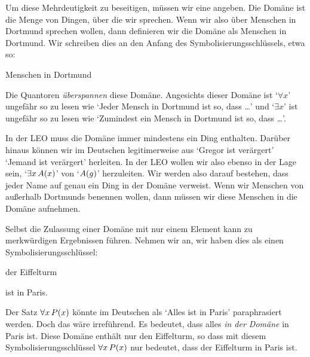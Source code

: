 Um diese Mehrdeutigkeit zu beseitigen, müssen wir eine  angeben. Die Domäne ist die Menge von Dingen, über die wir sprechen. Wenn wir also über Menschen in Dortmund sprechen wollen, dann definieren wir die Domäne als Menschen in Dortmund. Wir schreiben dies an den Anfang des Symbolisierungsschlüssels, etwa so:
	\begin{ekey}
		\item[\text{Domäne}] Menschen in Dortmund
	\end{ekey}
Die Quantoren \emph{überspannen} diese Domäne. Angesichts dieser Domäne ist `$\forall x$' ungefähr so zu lesen wie `Jeder Mensch in Dortmund ist so, dass \ldots' und `$\exists x$' ist ungefähr so zu lesen wie `Zumindest ein Mensch in Dortmund ist so, dass \ldots'. 


In der LEO muss die Domäne immer mindestens ein Ding enthalten. Darüber hinaus können wir im Deutschen legitimerweise aus `Gregor ist verärgert' `Jemand ist verärgert' herleiten. In der LEO wollen wir also ebenso in der Lage sein, `$\exists x\, \mathord{A}(x)$' von `$\mathord{A}(g)$' herzuleiten. Wir werden also darauf bestehen, dass jeder Name auf genau ein Ding in der Domäne verweist. Wenn wir Menschen von au{\ss}erhalb Dortmunds benennen wollen, dann müssen wir diese Menschen in die Domäne aufnehmen. 

Selbst die Zulassung einer Domäne mit nur einem Element kann zu merkwürdigen Ergebnissen führen. Nehmen wir an, wir haben dies als einen Symbolisierungsschlüssel:
\begin{ekey}
\item[\text{Domäne}] der Eiffelturm
\item[\atom{P}{x}]  ist in Paris.
\end{ekey}
Der Satz $\forall x\,\mathord{P}(x)$ könnte im Deutschen als `Alles ist in Paris' paraphrasiert werden. Doch das wäre irreführend. Es bedeutet, dass alles \emph{in der Domäne} in Paris ist. Diese Domäne enthält nur den Eiffelturm, so dass mit diesem Symbolisierungsschlüssel $\forall x\,\mathord{P}(x)$ nur bedeutet, dass der Eiffelturm in Paris ist.

